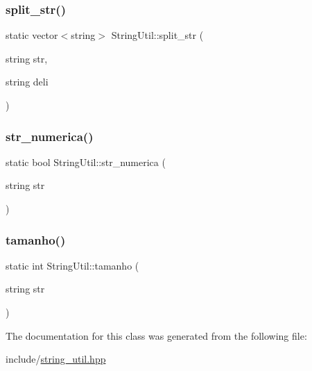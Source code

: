 \mbox{\label{classStringUtil_a317755bea8c956f173b28b18105c1cd5}} 
\subsubsection{\texorpdfstring{split\+\_\+str()}{split\_str()}}
{\footnotesize\ttfamily static vector$<$string$>$ String\+Util\+::split\+\_\+str (\begin{DoxyParamCaption}\item[{string}]{str,  }\item[{string}]{deli }\end{DoxyParamCaption})\hspace{0.3cm}{\ttfamily [static]}}

\mbox{\label{classStringUtil_af3da5d9d1b581638b5c76257ab201e62}} 
\subsubsection{\texorpdfstring{str\+\_\+numerica()}{str\_numerica()}}
{\footnotesize\ttfamily static bool String\+Util\+::str\+\_\+numerica (\begin{DoxyParamCaption}\item[{string}]{str }\end{DoxyParamCaption})\hspace{0.3cm}{\ttfamily [static]}}

\mbox{\label{classStringUtil_ab01f3cadbd7d67bf15d2bb06db0b1c8e}} 
\subsubsection{\texorpdfstring{tamanho()}{tamanho()}}
{\footnotesize\ttfamily static int String\+Util\+::tamanho (\begin{DoxyParamCaption}\item[{string}]{str }\end{DoxyParamCaption})\hspace{0.3cm}{\ttfamily [static]}}



The documentation for this class was generated from the following file\+:\begin{DoxyCompactItemize}
\item 
include/\hyperlink{string__util_8hpp}{string\+\_\+util.\+hpp}\end{DoxyCompactItemize}
